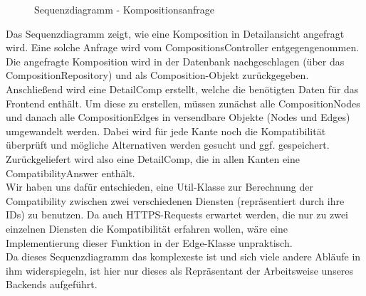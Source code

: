 \begin{figure}[h]
	\centering
	\caption{Sequenzdiagramm - Kompositionsanfrage}
	\label{fig:sequenz-a}
\end{figure}
\noindent
Das Sequenzdiagramm zeigt, wie eine Komposition in Detailansicht angefragt wird. 
Eine solche Anfrage wird vom CompositionsController entgegengenommen.
Die angefragte Komposition wird in der Datenbank nachgeschlagen (über das CompositionRepository) und als Composition-Objekt zurückgegeben.
Anschließend wird eine DetailComp erstellt, welche die benötigten Daten für das Frontend enthält. 
Um diese zu erstellen, müssen zunächst alle CompositionNodes und danach alle CompositionEdges in versendbare Objekte (Nodes und Edges) umgewandelt werden. 
Dabei wird für jede Kante noch die Kompatibilität überprüft und mögliche Alternativen werden gesucht und ggf. gespeichert. Zurückgeliefert wird also eine DetailComp, die in allen Kanten eine CompatibilityAnswer enthält.\newline
\\ \noindent
Wir haben uns dafür entschieden, eine Util-Klasse zur Berechnung der Compatibility zwischen zwei verschiedenen Diensten (repräsentiert durch ihre IDs) zu benutzen.
Da auch HTTPS-Requests erwartet werden, die nur zu zwei einzelnen Diensten die Kompatibilität erfahren wollen, wäre eine Implementierung dieser Funktion in der Edge-Klasse unpraktisch.\newline
\\ \noindent
Da dieses Sequenzdiagramm das komplexeste ist und sich viele andere Abläufe in ihm widerspiegeln, ist hier nur dieses als Repräsentant der Arbeitsweise unseres Backends aufgeführt.

